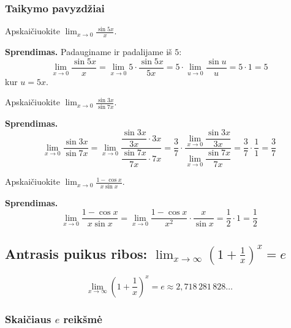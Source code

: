 \subsubsection*{Taikymo pavyzdžiai}

\begin{example}
Apskaičiuokite $\displaystyle\lim_{x \to 0} \frac{\sin 5x}{x}$.

\textbf{Sprendimas.} Padauginame ir padalijame iš $5$:
\[
  \lim_{x \to 0} \frac{\sin 5x}{x}
  = \lim_{x \to 0} 5 \cdot \frac{\sin 5x}{5x}
  = 5 \cdot \lim_{u \to 0} \frac{\sin u}{u}
  = 5 \cdot 1 = 5
\]
kur $u = 5x$.
\end{example}

\begin{example}
Apskaičiuokite $\displaystyle\lim_{x \to 0} \frac{\sin 3x}{\sin 7x}$.

\textbf{Sprendimas.}
\[
  \lim_{x \to 0} \frac{\sin 3x}{\sin 7x}
  = \lim_{x \to 0} \frac{\dfrac{\sin 3x}{3x} \cdot 3x}{\dfrac{\sin 7x}{7x} \cdot 7x}
  = \frac{3}{7} \cdot \frac{\lim_{x\to 0}\dfrac{\sin 3x}{3x}}{\lim_{x\to 0}\dfrac{\sin 7x}{7x}}
  = \frac{3}{7} \cdot \frac{1}{1} = \frac{3}{7}
\]
\end{example}

\begin{example}
Apskaičiuokite $\displaystyle\lim_{x \to 0} \frac{1 - \cos x}{x \sin x}$.

\textbf{Sprendimas.}
\[
  \lim_{x \to 0} \frac{1 - \cos x}{x \sin x}
  = \lim_{x \to 0} \frac{1 - \cos x}{x^2} \cdot \frac{x}{\sin x}
  = \frac{1}{2} \cdot 1 = \frac{1}{2}
\]
\end{example}

\subsection{Antrasis puikus ribos: \texorpdfstring{$\lim_{x \to \infty}\left(1+\frac{1}{x}\right)^x = e$}{lim(1+1/x)^x = e, kai x->inf}}

\begin{tcolorbox}[colback=green!5!white, colframe=green!60!black, title=Antroji puikioji riba]
\[
  \lim_{x \to \infty} \left(1 + \frac{1}{x}\right)^x = e \approx 2{,}718\,281\,828\ldots
\]
\end{tcolorbox}

\subsubsection*{Skaičiaus $e$ reikšmė}

